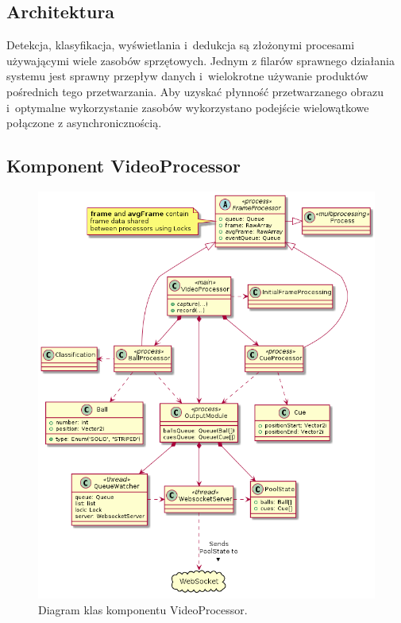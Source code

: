\documentclass[12pt]{article}
\begin{document}
\subsection{Architektura}

Detekcja, klasyfikacja, wyświetlania i~dedukcja są złożonymi procesami używającymi wiele zasobów sprzętowych. Jednym z filarów sprawnego działania systemu jest sprawny przepływ danych i~wielokrotne używanie produktów pośrednich tego przetwarzania. Aby uzyskać płynność przetwarzanego obrazu i~optymalne wykorzystanie zasobów wykorzystano podejście wielowątkowe połączone z asynchronicznością.

\subsection{Komponent VideoProcessor}

\begin{figure}[!htb]
    \centering
    \includegraphics[width=14cm]{./diagrams/out/video_processor_cd.png}
    \caption{Diagram klas komponentu VideoProcessor.}
    \label{vp_cd}
\end{figure}
\end{document}
